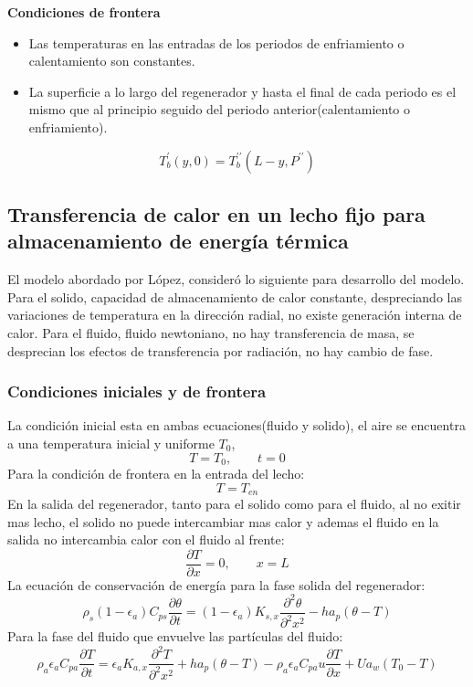 \documentclass[12pt,letterpaper,final]{article}%
\begin{document}
\textbf{Condiciones de frontera}
\begin{itemize}
	\item Las temperaturas en las entradas de los periodos de enfriamiento o calentamiento son constantes.
	\item La superficie a lo largo del regenerador y hasta el final de cada periodo es el mismo que al principio seguido del periodo anterior(calentamiento o enfriamiento). 
\end{itemize}
\begin{equation*}
	T_b^\prime (y,0) = T_b^{\prime \prime} (L - y,P^{\prime \prime})
\end{equation*}

\subsection*{Transferencia de calor en un lecho fijo para almacenamiento de energía térmica}
El modelo abordado por López\cite{Lopez2013}, consideró lo siguiente para desarrollo del modelo. Para el solido, capacidad de almacenamiento de calor constante, despreciando las variaciones de temperatura en la dirección radial, no existe generación interna de calor. Para el fluido, fluido newtoniano, no hay transferencia de masa, se desprecian los efectos de transferencia por radiación, no hay cambio de fase. 
\subsubsection*{Condiciones iniciales y de frontera}
La condición inicial esta en ambas ecuaciones(fluido y solido), el aire se encuentra a una temperatura inicial y uniforme $T_0$, 
\begin{equation}
	T=T_0 , \qquad t=0
\end{equation} 
Para la condición de frontera en la entrada del lecho:
\begin{equation}
	T=T_{en}
\end{equation}
En la salida del regenerador, tanto para el solido como para el fluido, al no exitir mas lecho, el solido no puede intercambiar mas calor y ademas el fluido en la salida no intercambia calor con el fluido al frente:
\begin{equation}
	\frac{\partial T}{\partial x} = 0, \qquad x=L
\end{equation}
La ecuación de conservación de energía para la fase solida del regenerador:
\begin{equation}
	\rho_s(1-\epsilon_a)C_{ps}\frac{\partial \theta}{\partial t} = (1-\epsilon_a)K_{s,x}\frac{\partial^2 \theta}{\partial^2 x^2} - ha_p(\theta - T)
\end{equation}
Para la fase del fluido que envuelve las partículas del fluido:
\begin{equation}
	\rho_a\epsilon_a C_{pa} \frac{\partial T}{\partial t} = \epsilon_a K_{a,x} \frac{\partial^2 T}{\partial^2 x^2} + ha_p(\theta - T) - \rho_a\epsilon_a C_{pa} u \frac{\partial T}{\partial x} + U a_w(T_0 - T )
\end{equation}
\end{document}
